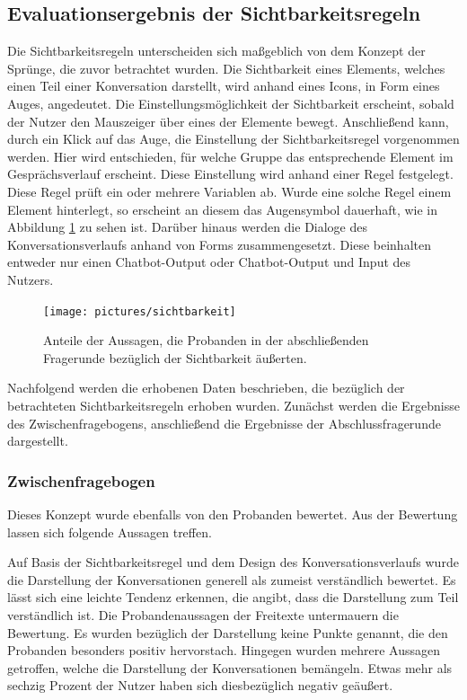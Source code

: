 \subsection{Evaluationsergebnis der Sichtbarkeitsregeln}
Die Sichtbarkeitsregeln unterscheiden sich maßgeblich von dem Konzept der Sprünge, die zuvor betrachtet wurden. Die Sichtbarkeit eines Elements, welches einen Teil einer Konversation darstellt, wird anhand eines Icons, in Form eines Auges, angedeutet. Die Einstellungsmöglichkeit der Sichtbarkeit erscheint, sobald der Nutzer den Mauszeiger über eines der Elemente bewegt. Anschließend kann, durch ein Klick auf das Auge, die Einstellung der Sichtbarkeitsregel vorgenommen werden. Hier wird entschieden, für welche Gruppe das entsprechende Element im Gesprächsverlauf erscheint. Diese Einstellung wird anhand einer Regel festgelegt. Diese Regel prüft ein oder mehrere Variablen ab. Wurde eine solche Regel einem Element hinterlegt, so erscheint an diesem das Augensymbol dauerhaft, wie in Abbildung \ref{sichtbarkeit} zu sehen ist. Darüber hinaus werden die Dialoge des Konversationsverlaufs anhand von Forms zusammengesetzt. Diese beinhalten entweder nur einen Chatbot-Output oder Chatbot-Output und Input des Nutzers. 

\begin{figure}[h]
\centering
\texttt{[image: pictures/sichtbarkeit]}
\caption{Anteile der Aussagen, die Probanden in der abschließenden Fragerunde bezüglich der Sichtbarkeit äußerten.}
\label{sichtbarkeit}
\end{figure}

Nachfolgend werden die erhobenen Daten beschrieben, die bezüglich der betrachteten Sichtbarkeitsregeln erhoben wurden. Zunächst werden die Ergebnisse des Zwischenfragebogens, anschließend die Ergebnisse der Abschlussfragerunde dargestellt.

\subsubsection{Zwischenfragebogen}
Dieses Konzept wurde ebenfalls von den Probanden bewertet. Aus der Bewertung lassen sich folgende Aussagen treffen. 

Auf Basis der Sichtbarkeitsregel und dem Design des Konversationsverlaufs wurde die Darstellung der Konversationen generell als zumeist verständlich bewertet. Es lässt sich eine leichte Tendenz erkennen, die angibt, dass die Darstellung zum Teil verständlich ist. Die Probandenaussagen der Freitexte untermauern die Bewertung. Es wurden bezüglich der Darstellung keine Punkte genannt, die den Probanden besonders positiv hervorstach. Hingegen wurden mehrere Aussagen getroffen, welche die Darstellung der Konversationen bemängeln. Etwas mehr als sechzig Prozent der Nutzer haben sich diesbezüglich negativ geäußert.

